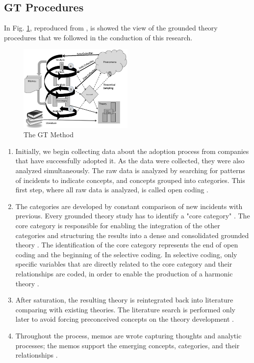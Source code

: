 \subsection{GT Procedures}

In Fig. \ref{fig1}, reproduced from \cite{adolph2011using}, is showed the view
of the grounded theory procedures that we followed in the conduction of this
research.

\begin{figure}[htpb]
  \centering
  \includegraphics[width=0.5\textwidth,natwidth=821,natheight=617]{GT.png}
  \caption{The GT Method \cite{adolph2011using}}
  \label{fig1}
\end{figure}

\begin{enumerate}[label=(\Alph*)]
\item Initially, we begin collecting data about the adoption process from
companies that have successfully adopted it. As the data were collected, they
were also analyzed simultaneously. The raw data is analyzed by searching for
patterns of incidents to indicate concepts, and concepts grouped into
categories. This first step, where all raw data is analyzed, is called open
coding \cite{stol2016grounded}.

\item The categories are developed by constant comparison of new incidents with
previous. Every grounded theory study has to identify a "core category"
\cite{stol2016grounded}. The core category is responsible for enabling the
integration of the other categories and structuring the results into a dense
and consolidated grounded theory \cite{jantunen2014using}. The identification
of the core category represents the end of open coding and the beginning of the
selective coding. In selective coding, only specific variables that are
directly related to the core category and their relationships are coded, in
order to enable the production of a harmonic theory \cite{coleman2007using}
\cite{hoda2011impact}.

\item After saturation, the resulting theory is reintegrated back into
literature comparing with existing theories. The literature search is performed
only later to avoid forcing preconceived concepts on the theory development
\cite{adolph2012reconciling}.

\item Throughout the process, memos are wrote capturing thoughts and analytic
processes; the memos support the emerging concepts, categories, and their
relationships \cite{adolph2012reconciling}.

\end{enumerate}

